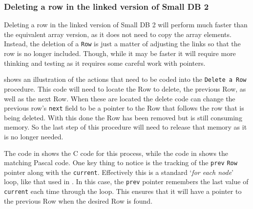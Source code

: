 \begin{figure}[p]
\end{figure}

\begin{figure}[p]
\end{figure}

\begin{figure}[p]
\end{figure}


\clearpage
\subsubsection{Deleting a row in the linked version of Small DB 2} %
\label{ssub:deleting_a_row_in_the_linked_version_of_small_db_2}

Deleting a row in the linked version of Small DB 2 will perform much faster than the equivalent array version, as it does not need to copy the array elements. Instead, the deletion of a \texttt{Row} is just a matter of adjusting the links so that the row is no longer included. Though, while it may be faster it will require more thinking and testing as it requires some careful work with pointers.

 shows an illustration of the actions that need to be coded into the \texttt{Delete a Row} procedure. This code will need to locate the Row to delete, the previous Row, as well as the next Row. When these are located the delete code can change the previous row's \texttt{next} field to be a pointer to the Row that follows the row that is being deleted. With this done the Row has been removed but is still consuming memory. So the last step of this procedure will need to release that memory as it is no longer needed.

The code in  shows the C code for this process, while the code in  shows the matching Pascal code. One key thing to notice is the tracking of the \texttt{prev} \texttt{Row} pointer along with the \texttt{current}. Effectively this is a standard `\emph{for each node}' loop, like that used in . In this case, the \texttt{prev} pointer remembers the last value of \texttt{current} each time through the loop. This ensures that it will have a pointer to the previous Row when the desired Row is found.


